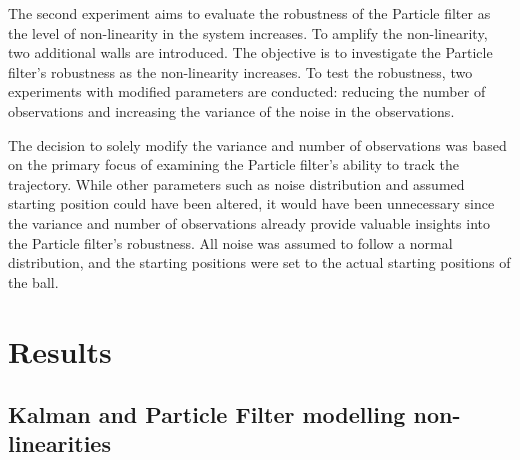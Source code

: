 \documentclass[conference]{IEEEtran}
\begin{document}
The second experiment aims to evaluate the robustness of the Particle filter as the level of non-linearity in the system increases.
To amplify the non-linearity, two additional walls are introduced.
The objective is to investigate the Particle filter's robustness as the non-linearity increases.
To test the robustness, two experiments with modified parameters are conducted: reducing the number of observations and increasing the variance of the noise in the observations.

The decision to solely modify the variance and number of observations was based on the primary focus of examining the Particle filter's ability to track the trajectory.
While other parameters such as noise distribution and assumed starting position could have been altered, it would have been unnecessary since the variance and number of observations already provide valuable insights into the Particle filter's robustness.
All noise was assumed to follow a normal distribution, and the starting positions were set to the actual starting positions of the ball.



\section{Results}


\subsection{Kalman and Particle Filter modelling non-linearities}
\end{document}
